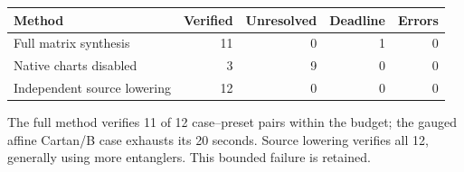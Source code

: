 \begin{center}\small\begin{tabular}{lrrrr}\toprule
Method & Verified & Unresolved & Deadline & Errors\\\midrule
Full matrix synthesis & 11 & 0 & 1 & 0\\
Native charts disabled & 3 & 9 & 0 & 0\\
Independent source lowering & 12 & 0 & 0 & 0\\
\bottomrule\end{tabular}\end{center}
The full method verifies 11 of 12 case--preset pairs within the budget; the gauged affine Cartan/B case exhausts its 20 seconds. Source lowering verifies all 12, generally using more entanglers. This bounded failure is retained.
